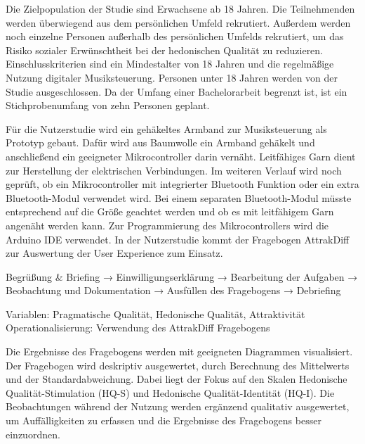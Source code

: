 \documentclass[12pt, a4paper]{article}
\begin{document}
\begin{description}[style=nextline, leftmargin=2em]
  \item[Teilnehmende]
  Die Zielpopulation der Studie sind Erwachsene ab 18 Jahren. Die Teilnehmenden werden überwiegend aus dem persönlichen Umfeld rekrutiert. Außerdem werden noch einzelne Personen außerhalb des persönlichen Umfelds rekrutiert, um das Risiko sozialer Erwünschtheit bei der hedonischen Qualität zu reduzieren. Einschlusskriterien sind ein Mindestalter von 18 Jahren und die regelmäßige Nutzung digitaler Musiksteuerung. Personen unter 18 Jahren werden von der Studie ausgeschlossen. Da der Umfang einer Bachelorarbeit begrenzt ist, ist ein Stichprobenumfang von zehn Personen geplant.

  \item[Materialien \& Apparatus]
  Für die Nutzerstudie wird ein gehäkeltes Armband zur Musiksteuerung als Prototyp gebaut. Dafür wird aus Baumwolle ein Armband gehäkelt und anschließend ein geeigneter Mikrocontroller darin vernäht. Leitfähiges Garn dient zur Herstellung der elektrischen Verbindungen. Im weiteren Verlauf wird noch geprüft, ob ein Mikrocontroller mit integrierter Bluetooth Funktion oder ein extra Bluetooth-Modul verwendet wird. Bei einem separaten Bluetooth-Modul müsste entsprechend auf die Größe geachtet werden und ob es mit leitfähigem Garn angenäht werden kann. Zur Programmierung des Mikrocontrollers wird die Arduino IDE verwendet.
  In der Nutzerstudie kommt der Fragebogen AttrakDiff zur Auswertung der User Experience zum Einsatz.

  \item[Durchführung]
   Begrüßung \& Briefing → Einwilligungserklärung → Bearbeitung der Aufgaben → Beobachtung und Dokumentation → Ausfüllen des Fragebogens → Debriefing

  \item[Erhobene Variablen]
  Variablen: Pragmatische Qualität, Hedonische Qualität, Attraktivität\\
  Operationalisierung: Verwendung des AttrakDiff Fragebogens

  \item[Auswertung]
  Die Ergebnisse des Fragebogens werden mit geeigneten Diagrammen visualisiert. Der Fragebogen wird deskriptiv ausgewertet, durch Berechnung des Mittelwerts und der Standardabweichung. Dabei liegt der Fokus auf den Skalen Hedonische Qualität-Stimulation (HQ-S) und Hedonische Qualität-Identität (HQ-I). Die Beobachtungen während der Nutzung werden ergänzend qualitativ ausgewertet, um Auffälligkeiten zu erfassen und die Ergebnisse des Fragebogens besser einzuordnen.
    
\end{description}
\end{document}
